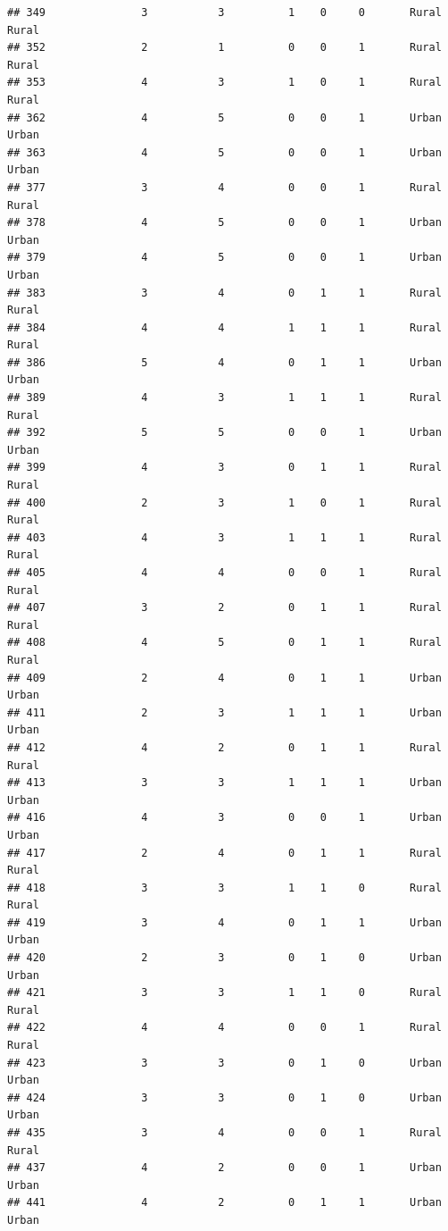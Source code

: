 \documentclass[
]{article}
\begin{document}
\begin{verbatim}
## 349               3           3          1    0     0       Rural Rural
## 352               2           1          0    0     1       Rural Rural
## 353               4           3          1    0     1       Rural Rural
## 362               4           5          0    0     1       Urban Urban
## 363               4           5          0    0     1       Urban Urban
## 377               3           4          0    0     1       Rural Rural
## 378               4           5          0    0     1       Urban Urban
## 379               4           5          0    0     1       Urban Urban
## 383               3           4          0    1     1       Rural Rural
## 384               4           4          1    1     1       Rural Rural
## 386               5           4          0    1     1       Urban Urban
## 389               4           3          1    1     1       Rural Rural
## 392               5           5          0    0     1       Urban Urban
## 399               4           3          0    1     1       Rural Rural
## 400               2           3          1    0     1       Rural Rural
## 403               4           3          1    1     1       Rural Rural
## 405               4           4          0    0     1       Rural Rural
## 407               3           2          0    1     1       Rural Rural
## 408               4           5          0    1     1       Rural Rural
## 409               2           4          0    1     1       Urban Urban
## 411               2           3          1    1     1       Urban Urban
## 412               4           2          0    1     1       Rural Rural
## 413               3           3          1    1     1       Urban Urban
## 416               4           3          0    0     1       Urban Urban
## 417               2           4          0    1     1       Rural Rural
## 418               3           3          1    1     0       Rural Rural
## 419               3           4          0    1     1       Urban Urban
## 420               2           3          0    1     0       Urban Urban
## 421               3           3          1    1     0       Rural Rural
## 422               4           4          0    0     1       Rural Rural
## 423               3           3          0    1     0       Urban Urban
## 424               3           3          0    1     0       Urban Urban
## 435               3           4          0    0     1       Rural Rural
## 437               4           2          0    0     1       Urban Urban
## 441               4           2          0    1     1       Urban Urban

\end{verbatim}
\end{document}
